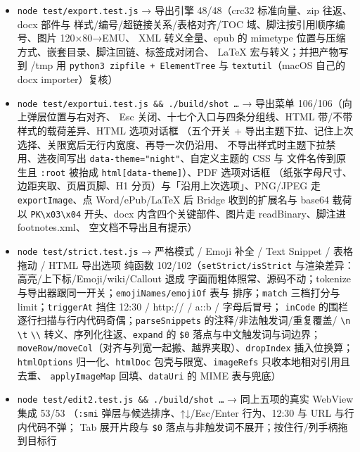 \documentclass[11pt,a4paper]{ctexart}
\begin{document}
\begin{itemize}
TOC 层级嵌套、点目录滚动 + 高亮、脚注按出现顺序编号、悬停 title、分栏预览锚点与
主编辑器逐项一致、文档重载后目录跟随、无标题空态、角标配色与脚注行样式、
分栏导出也带目录）
\item \texttt{node test/export.test.js} → 导出引擎 48/48（crc32 标准向量、zip 往返、docx 部件与
样式/编号/超链接关系/表格对齐/TOC 域、脚注按引用顺序编号、图片 120×80→EMU、
XML 转义全量、epub 的 mimetype 位置与压缩方式、嵌套目录、脚注回链、标签成对闭合、
LaTeX 宏与转义；并把产物写到 /tmp 用 \texttt{python3 zipfile + ElementTree} 与
\texttt{textutil}（macOS 自己的 docx importer）复核）
\item \texttt{node test/exportui.test.js \&\& ./build/shot …} → 导出菜单 106/106（向上弹层位置与右对齐、
Esc 关闭、十七个入口与四条分组线、HTML 带/不带样式的载荷差异、HTML 选项对话框
（五个开关 + 导出主题下拉、记住上次选择、关限宽后无行内宽度、再导一次仍沿用、
不导出样式时主题下拉禁用、选夜间写出 \texttt{data-theme="night"}、自定义主题的 CSS 与
文件名传到原生且 \texttt{:root} 被抬成 \texttt{html[data-theme]}）、PDF 选项对话框
（纸张字母尺寸、边距夹取、页眉页脚、H1 分页）与「沿用上次选项」、PNG/JPEG 走
\texttt{exportImage}、点 Word/ePub/LaTeX 后 Bridge 收到的扩展名与 base64 载荷
以 \texttt{PK\textbackslash{}x03\textbackslash{}x04} 开头、docx 内含四个关键部件、图片走 readBinary、脚注进 footnotes.xml、
空文档不导出且有提示）
\item \texttt{node test/strict.test.js} → 严格模式 / Emoji 补全 / Text Snippet / 表格拖动 / HTML 导出选项
纯函数 102/102（\texttt{setStrict/isStrict} 与渲染差异：高亮/上下标/Emoji/wiki/Callout 退成
字面而粗体照常、源码不动；tokenize 与导出器跟同一开关；\texttt{emojiNames/emojiOf} 表与
排序；\texttt{match} 三档打分与 limit；\texttt{triggerAt} 挡住 12:30 / http:// / a::b / 字母后冒号；
\texttt{inCode} 的围栏逐行扫描与行内代码奇偶；\texttt{parseSnippets} 的注释/非法触发词/重复覆盖/
\texttt{\textbackslash{}n} \texttt{\textbackslash{}t} \texttt{\textbackslash{}\textbackslash{}} 转义、序列化往返、\texttt{expand} 的 \texttt{\$0} 落点与中文触发词与词边界；
\texttt{moveRow/moveCol}（对齐与列宽一起搬、越界夹取）、\texttt{dropIndex} 插入位换算；
\texttt{htmlOptions} 归一化、\texttt{htmlDoc} 包壳与限宽、\texttt{imageRefs} 只收本地相对引用且去重、
\texttt{applyImageMap} 回填、\texttt{dataUri} 的 MIME 表与兜底）
\item \texttt{node test/edit2.test.js \&\& ./build/shot …} → 同上五项的真实 WebView 集成 53/53
（\texttt{:smi} 弹层与候选排序、↑↓/Esc/Enter 行为、12:30 与 URL 与行内代码不弹；
Tab 展开片段与 \texttt{\$0} 落点与非触发词不展开；按住行/列手柄拖到目标行

\end{itemize}
\end{document}
